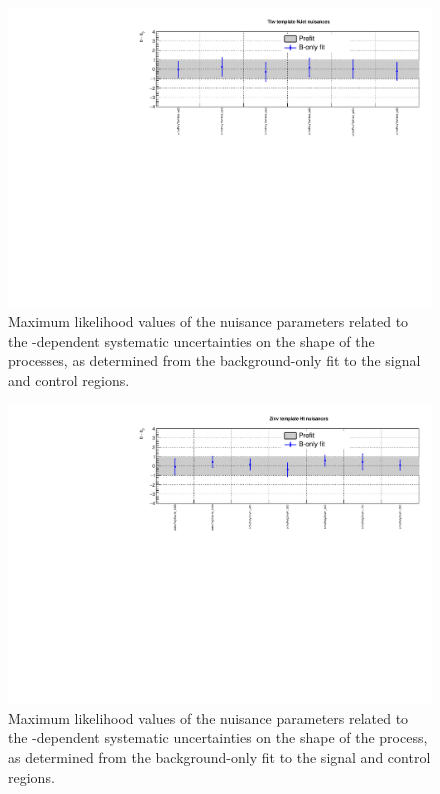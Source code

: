 \begin{figure}[h!]
	\centering
	\includegraphics[width=1.\linewidth]{figs/results/nuis/TemplateTtw_njet_nuisances}
	\caption{Maximum likelihood values of the nuisance parameters related to 
	the \njet-dependent systematic uncertainties on the \mht shape of the \ttw 
	processes, as determined from the background-only fit to the signal and 
	control regions.}
\end{figure}

\begin{figure}[h!]
	\centering
	\includegraphics[width=1.\linewidth]{figs/results/nuis/TemplateZinv_ht_nuisances}
	\caption{Maximum likelihood values of the nuisance parameters related to 
	the \scalht-dependent systematic uncertainties on the \mht shape of the 
	\znnj process, as determined from the background-only fit to the signal and 
	control regions.}
\end{figure}

